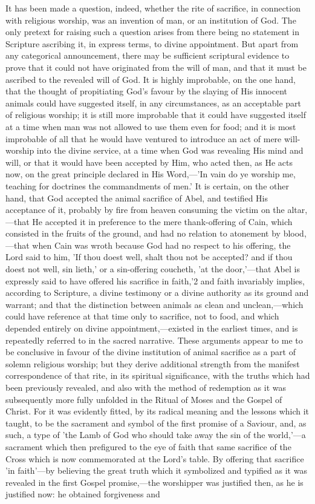 \documentclass[
]{book}
\begin{document}
It has been made a question, indeed, whether the rite of sacrifice, in connection with religious worship, was an invention of man, or an institution of God. The only pretext for raising such a question arises from there being no statement in Scripture ascribing it, in express terms, to divine appointment. But apart from any categorical announcement, there may be sufficient scriptural evidence to prove that it could not have originated from the will of man, and that it must be ascribed to the revealed will of God. It is highly improbable, on the one hand, that the thought of propitiating God's favour by the slaying of His innocent animals could have suggested itself, in any circumstances, as an acceptable part of religious worship; it is still more improbable that it could have suggested itself at a time when man was not allowed to use them even for food; and it is most improbable of all that he would have ventured to introduce an act of mere will-worship into the divine service, at a time when God was revealing His mind and will, or that it would have been accepted by Him, who acted then, as He acts now, on the great principle declared in His Word,---'In vain do ye worship me, teaching for doctrines the commandments of men.' It is certain, on the other hand, that God accepted the animal sacrifice of Abel, and testified His acceptance of it, probably by fire from heaven consuming the victim on the altar,---that He accepted it in preference to the mere thank-offering of Cain, which consisted in the fruits of the ground, and had no relation to atonement by blood,---that when Cain was wroth because God had no respect to his offering, the Lord said to him, 'If thou doest well, shalt thou not be accepted? and if thou doest not well, sin lieth,' or a sin-offering coucheth, 'at the door,'---that Abel is expressly said to have offered his sacrifice in faith,'2 and faith invariably implies, according to Scripture, a divine testimony or a divine authority as its ground and warrant; and that the distinction between animals as clean and unclean,---which could have reference at that time only to sacrifice, not to food, and which depended entirely on divine appointment,---existed in the earliest times, and is repeatedly referred to in the sacred narrative. These arguments appear to me to be conclusive in favour of the divine institution of animal sacrifice as a part of solemn religious worship; but they derive additional strength from the manifest correspondence of that rite, in its spiritual significance, with the truths which had been previously revealed, and also with the method of redemption as it was subsequently more fully unfolded in the Ritual of Moses and the Gospel of Christ. For it was evidently fitted, by its radical meaning and the lessons which it taught, to be the sacrament and symbol of the first promise of a Saviour, and, as such, a type of 'the Lamb of God who should take away the sin of the world,'---a sacrament which then prefigured to the eye of faith that same sacrifice of the Cross which is now commemorated at the Lord's table. By offering that sacrifice 'in faith'---by believing the great truth which it symbolized and typified as it was revealed in the first Gospel promise,---the worshipper was justified then, as he is justified now: he obtained forgiveness and 
\end{document}
